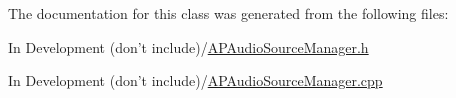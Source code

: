 The documentation for this class was generated from the following files\+:\begin{DoxyCompactItemize}
\item 
In Development (don't include)/\hyperlink{_a_p_audio_source_manager_8h}{A\+P\+Audio\+Source\+Manager.\+h}\item 
In Development (don't include)/\hyperlink{_a_p_audio_source_manager_8cpp}{A\+P\+Audio\+Source\+Manager.\+cpp}\end{DoxyCompactItemize}
